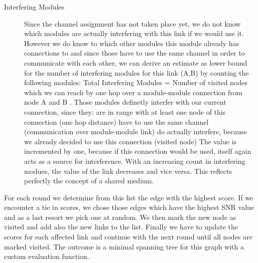 \begin{description}
    \item[Interfering Modules]
    Since the channel assignment has not taken place yet, we do not know which modules are actually interfering with this link if we would use it.
    However we do know to which other modules this module already has connections to and since those have to use the same channel in order to communicate with each
    other, we can derive an estimate as lower bound for the number of interfering modules for this link (A,B) by counting the following modules:
    Total Interfering Modules = Number of visited nodes which we can reach by one hop over a module-module connection from node A and B
    . Those modules definetly interfer with our current connection, since they:
      are in range with at least one node of this connection (one hop distance)
      have to use the same channel (communication over module-module link)
      do actually interfere, because we already decided to use this connection (visited node)
    The value is incremented by one, because if this connection would be used, itself again acts as a source for interference.
    With an increasing count in interfering modues, the value of the link decreases and vice versa. This reflects perfectly the concept of a shared medium.
  \end{description}
  For each round we determine from this list the edge with the highest score. If we encounter a tie in scores, we chose those edges which have the highest SNR value and as a last
  resort we pick one at random. We then mark the new node as visited and add also the new links to the list.
  Finally we have to update the scores for each affected link and continue with the next round until all nodes are marked visited.
  The outcome is a minimal spanning tree for this graph with a custom evaluation function.
